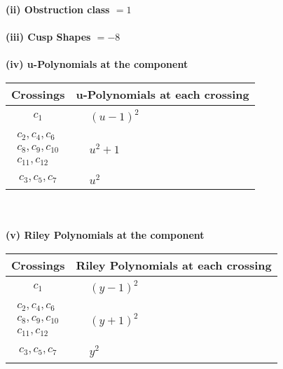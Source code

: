 \documentclass[1p]{elsarticle_modified}
\theoremstyle{definition}
\begin{document}
\flushleft \textbf{(ii) Obstruction class $= 1$}\\~\\
\flushleft \textbf{(iii) Cusp Shapes $= -8$}\\~\\
\newpage\renewcommand{\arraystretch}{1}
\flushleft \textbf{(iv) u-Polynomials at the component}\newline \\
\begin{tabular}{m{50pt}|m{274pt}}
Crossings & \hspace{64pt}u-Polynomials at each crossing \\
\hline $$\begin{aligned}c_{1}\end{aligned}$$&$\begin{aligned}
&(u-1)^2
\end{aligned}$\\
\hline $$\begin{aligned}c_{2},c_{4},c_{6}\\c_{8},c_{9},c_{10}\\c_{11},c_{12}\end{aligned}$$&$\begin{aligned}
&u^2+1
\end{aligned}$\\
\hline $$\begin{aligned}c_{3},c_{5},c_{7}\end{aligned}$$&$\begin{aligned}
&u^2
\end{aligned}$\\
\hline
\end{tabular}\\~\\
\newpage\renewcommand{\arraystretch}{1}
\flushleft \textbf{(v) Riley Polynomials at the component}\newline \\
\begin{tabular}{m{50pt}|m{274pt}}
Crossings & \hspace{64pt}Riley Polynomials at each crossing \\
\hline $$\begin{aligned}c_{1}\end{aligned}$$&$\begin{aligned}
&(y-1)^2
\end{aligned}$\\
\hline $$\begin{aligned}c_{2},c_{4},c_{6}\\c_{8},c_{9},c_{10}\\c_{11},c_{12}\end{aligned}$$&$\begin{aligned}
&(y+1)^2
\end{aligned}$\\
\hline $$\begin{aligned}c_{3},c_{5},c_{7}\end{aligned}$$&$\begin{aligned}
&y^2
\end{aligned}$\\
\hline
\end{tabular}\\~\\
\end{document}
